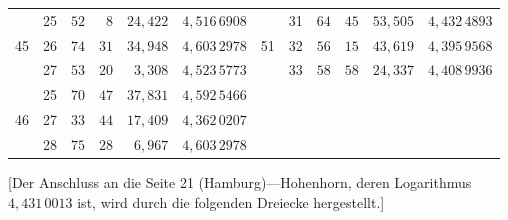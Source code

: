 \begin{center}
\begin{tabular}{|c|c|r@{\;}r@{\;}r|c||c|c|r@{\;}r@{\;}r|c|}
 & 25 & $52$ & $8$ & $24{,}422$ & $4{,}516\,6908$ &  & 31 & $64$ & $45$ & $53{,}505$ & $4{,}432\,4893$\\
45 & 26 & $74$ & $31$ & $34{,}948$ & $4{,}603\,2978$ & 51 & 32 & $56$ & $15$ & $43{,}619$ & $4{,}395\,9568$\\
 & 27 & $53$ & $20$ & $3{,}308$ & $4{,}523\,5773$ &  & 33 & $58$ & $58$ & $24{,}337$ & $4{,}408\,9936$\\[3pt]
 & 25 & $70$ & $47$ & $37{,}831$ & $4{,}592\,5466$ &  &  &  &  &  & \\
46 & 27 & $33$ & $44$ & $17{,}409$ & $4{,}362\,0207$ &  &  &  &  &  & \\
 & 28 & $75$ & $28$ & $6{,}967$ & $4{,}603\,2978$ &  &  &  &  &  & \\
\end{tabular}\end{center}

[Der Anschluss an die Seite 21 (Hamburg)---Hohenhorn, deren Logarithmus
$4{,}431\,0013$ ist, wird durch die folgenden Dreiecke hergestellt.]

